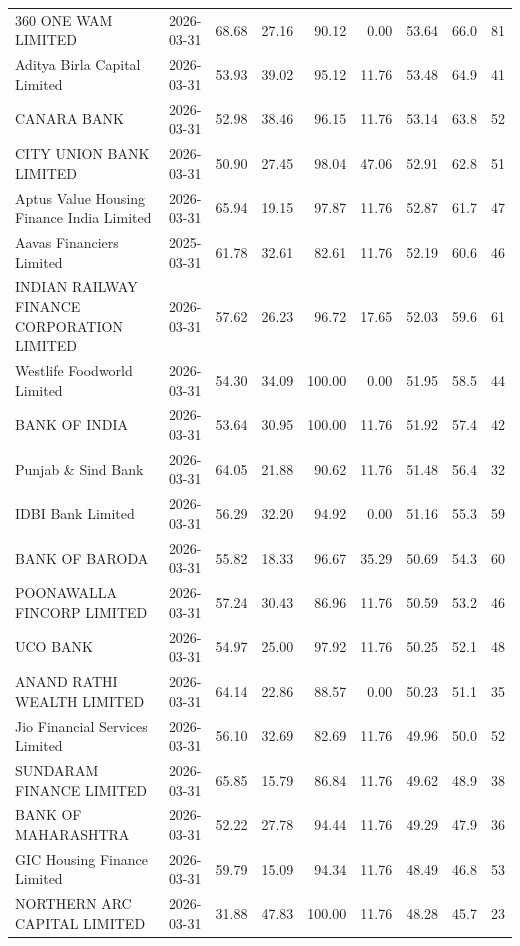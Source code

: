 {\begin{longtable}{@{}L{5.1cm}rrrrrrrr@{}}
360 ONE WAM LIMITED & 2026-03-31 & 68.68 & 27.16 & 90.12 & 0.00 & 53.64 & 66.0 & 81 \\
Aditya Birla Capital Limited & 2026-03-31 & 53.93 & 39.02 & 95.12 & 11.76 & 53.48 & 64.9 & 41 \\
CANARA BANK & 2026-03-31 & 52.98 & 38.46 & 96.15 & 11.76 & 53.14 & 63.8 & 52 \\
CITY UNION BANK LIMITED & 2026-03-31 & 50.90 & 27.45 & 98.04 & 47.06 & 52.91 & 62.8 & 51 \\
Aptus Value Housing Finance India Limited & 2026-03-31 & 65.94 & 19.15 & 97.87 & 11.76 & 52.87 & 61.7 & 47 \\
Aavas Financiers Limited & 2025-03-31 & 61.78 & 32.61 & 82.61 & 11.76 & 52.19 & 60.6 & 46 \\
INDIAN RAILWAY FINANCE CORPORATION LIMITED & 2026-03-31 & 57.62 & 26.23 & 96.72 & 17.65 & 52.03 & 59.6 & 61 \\
Westlife Foodworld Limited & 2026-03-31 & 54.30 & 34.09 & 100.00 & 0.00 & 51.95 & 58.5 & 44 \\
BANK OF INDIA & 2026-03-31 & 53.64 & 30.95 & 100.00 & 11.76 & 51.92 & 57.4 & 42 \\
Punjab \& Sind Bank & 2026-03-31 & 64.05 & 21.88 & 90.62 & 11.76 & 51.48 & 56.4 & 32 \\
IDBI Bank Limited & 2026-03-31 & 56.29 & 32.20 & 94.92 & 0.00 & 51.16 & 55.3 & 59 \\
BANK OF BARODA & 2026-03-31 & 55.82 & 18.33 & 96.67 & 35.29 & 50.69 & 54.3 & 60 \\
POONAWALLA FINCORP LIMITED & 2026-03-31 & 57.24 & 30.43 & 86.96 & 11.76 & 50.59 & 53.2 & 46 \\
UCO BANK & 2026-03-31 & 54.97 & 25.00 & 97.92 & 11.76 & 50.25 & 52.1 & 48 \\
ANAND RATHI WEALTH LIMITED & 2026-03-31 & 64.14 & 22.86 & 88.57 & 0.00 & 50.23 & 51.1 & 35 \\
Jio Financial Services Limited & 2026-03-31 & 56.10 & 32.69 & 82.69 & 11.76 & 49.96 & 50.0 & 52 \\
SUNDARAM FINANCE LIMITED & 2026-03-31 & 65.85 & 15.79 & 86.84 & 11.76 & 49.62 & 48.9 & 38 \\
BANK OF MAHARASHTRA & 2026-03-31 & 52.22 & 27.78 & 94.44 & 11.76 & 49.29 & 47.9 & 36 \\
GIC Housing Finance Limited & 2026-03-31 & 59.79 & 15.09 & 94.34 & 11.76 & 48.49 & 46.8 & 53 \\
NORTHERN ARC CAPITAL LIMITED & 2026-03-31 & 31.88 & 47.83 & 100.00 & 11.76 & 48.28 & 45.7 & 23 \\

\end{longtable}}
